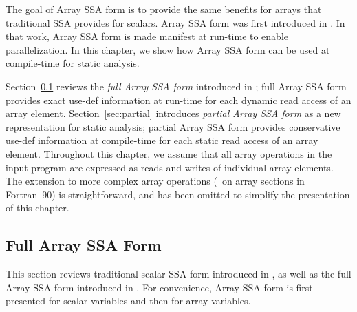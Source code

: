 The goal of Array SSA form is to provide the same benefits for arrays
that traditional SSA provides for scalars.
Array SSA form was first introduced in \cite{KnSa98}.  In that work,
Array SSA form is made manifest at run-time to enable
parallelization. In this chapter,  we show how Array SSA form can be used at
compile-time for static analysis.


Section~\ref{sec:full} reviews the {\it full Array SSA form} introduced
in \cite{KnSa98}; full Array SSA form provides exact use-def information 
at run-time for each dynamic read access of an array element.
Section~\ref{sec:partial} introduces {\it partial Array SSA form}
as a new representation for static analysis; partial Array SSA form provides
conservative use-def information at compile-time for each static
read access of an array element.
Throughout this chapter,
we assume that all array operations in the input program are
expressed as reads and writes of individual array elements.  The
extension to more complex array operations (\eg\ on array sections
in Fortran~90) is straightforward, and has been
omitted to simplify the presentation of this chapter.

\subsection{Full Array SSA Form}\label{sec:full}
This section reviews traditional scalar SSA form introduced in 
\cite{CFRWZ91a}, as well as the
full Array SSA form introduced
in \cite{KnSa98}.  For convenience, Array SSA form is first presented
for scalar variables and then for array variables.



